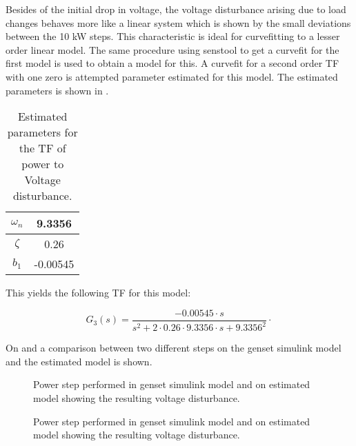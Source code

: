 Besides of the initial drop in voltage, the voltage disturbance arising due to load changes behaves more like a linear system which is shown by the small deviations between the 10 kW steps. This characteristic is ideal for curvefitting to a lesser order linear model. The same procedure using senstool to get a curvefit for the first model is used to obtain a model for this. A curvefit for a second order TF with one zero is attempted parameter estimated for this model. The estimated parameters is shown in .

\begin{table}[H]
\centering
\begin{tabular}{|c|c|}
\hline
$\omega_n$ & 9.3356 \\ \hline
$\zeta$  & 0.26 \\ \hline
$b_1$       & -0.00545    \\ \hline
\end{tabular}
\caption{Estimated parameters for the TF of power to Voltage disturbance.}
\label{tab:powervoltdisturbparam}
\end{table}  

This yields the following TF for this model:

\begin{equation}
\label{eq:tf3_one_zeros}
G_3(s) = \frac {-0.00545 \cdot s}{s^2+2\cdot 0.26 \cdot 9.3356 \cdot s + 9.3356^2} \unit{\cdot}
\end{equation} 

On  and  a comparison between two different steps on the genset simulink model and the estimated model is shown.

\begin{figure}[H]
\centering

\caption{Power step performed in genset simulink model and on estimated model showing the resulting voltage disturbance.}
\label{fig:powerstepsvoltdisturbancecomparison1020}
\end{figure}

\begin{figure}[H]
\centering

\caption{Power step performed in genset simulink model and on estimated model showing the resulting voltage disturbance.}
\label{fig:powerstepsvoltdisturbancecomparison1050}
\end{figure}

